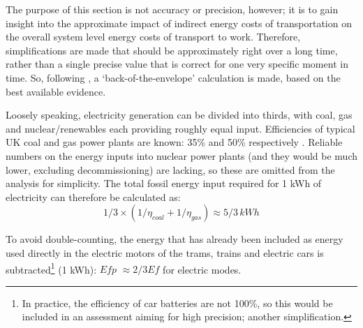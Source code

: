 The purpose of this section is not accuracy or precision, however; it is to
gain insight into the approximate impact of indirect energy costs of
transportation on the overall system level energy costs of transport to work.
Therefore, simplifications are made that should be
approximately right over a long time, rather than a single precise value that
is correct for one very specific moment in time. So, following
\citet{MacKay2009}, a `back-of-the-envelope' calculation is made, based on the
best available evidence.

Loosely speaking, electricity generation can be divided into thirds, with coal,
gas and nuclear/renewables each providing roughly equal input. Efficiencies of
typical UK coal and gas power plants are known: 35\% and 50\% respectively
\citep{Ecofys2006}.
Reliable numbers on the energy inputs into nuclear power plants
(and they would be much lower, excluding decommissioning)
are lacking, so these are omitted from the
analysis for simplicity. The total fossil energy input required for 1 kWh of
electricity can therefore be calculated as:
\begin{equation}
1/3 \times (1/\eta_{coal} + 1/\eta_{gas}) \approx 5/3\, kWh
\end{equation}

To avoid double-counting, the energy that has
already been included as energy used directly in the electric motors of the
trams, trains and electric cars is subtracted\footnote{In
practice, the efficiency of car batteries are not 100\%, so this would be
included in an assessment aiming for high precision; another simplification.
}
(1 kWh): $Efp$ $\approx 2/3 Ef$ for electric modes.

